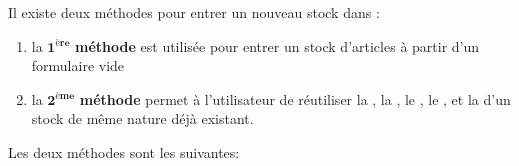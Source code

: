 Il existe deux m\'ethodes pour entrer un nouveau stock dans \yeren:
\begin{enumerate}[1)]
	\item la $\mathbf{1^{\textbf{\`ere}}}$ \textbf{m\'ethode}
	est utilis\'ee pour entrer un stock d'articles \`a partir
	d'un formulaire vide
	
	\item la $\mathbf{2^{\textbf{\`eme}}}$ \textbf{m\'ethode}
	permet \`a l'utilisateur de r\'eutiliser la
	, la ,
	le , le ,
	et la  d'un stock de m\^eme nature
	d\'ej\`a existant.\\
\end{enumerate}

Les deux m\'ethodes sont les suivantes:


